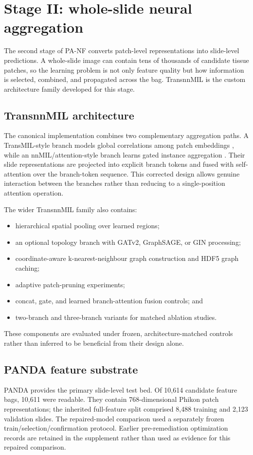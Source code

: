 \section{Stage II: whole-slide neural aggregation}


The second stage of PA-NF converts patch-level representations into slide-level predictions. A whole-slide image can contain tens of thousands of candidate tissue patches, so the learning problem is not only feature quality but how information is selected, combined, and propagated across the bag. TransnnMIL is the custom architecture family developed for this stage.

\subsection{TransnnMIL architecture}
The canonical implementation combines two complementary aggregation paths. A TransMIL-style branch models global correlations among patch embeddings \cite{shao2021transmil}, while an nnMIL/attention-style branch learns gated instance aggregation \cite{ilse2018attention}. Their slide representations are projected into explicit branch tokens and fused with self-attention over the branch-token sequence. This corrected design allows genuine interaction between the branches rather than reducing to a single-position attention operation.

The wider TransnnMIL family also contains:
\begin{itemize}
\item hierarchical spatial pooling over learned regions;
\item an optional topology branch with GATv2, GraphSAGE, or GIN processing;
\item coordinate-aware k-nearest-neighbour graph construction and HDF5 graph caching;
\item adaptive patch-pruning experiments;
\item concat, gate, and learned branch-attention fusion controls; and
\item two-branch and three-branch variants for matched ablation studies.
\end{itemize}

These components are evaluated under frozen, architecture-matched controls rather than inferred to be beneficial from their design alone.

\subsection{PANDA feature substrate}
PANDA \cite{bulten2022panda} provides the primary slide-level test bed. Of 10,614 candidate feature bags, 10,611 were readable. They contain 768-dimensional Phikon patch representations; the inherited full-feature split comprised 8,488 training and 2,123 validation slides. The repaired-model comparison used a separately frozen train/selection/confirmation protocol. Earlier pre-remediation optimization records are retained in the supplement rather than used as evidence for this repaired comparison.

